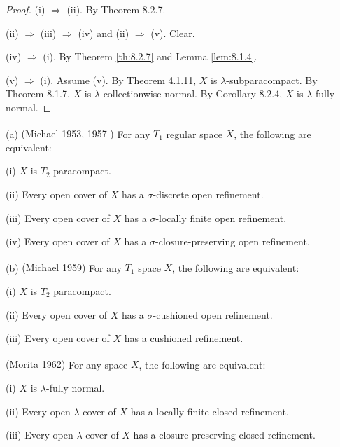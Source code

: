 \documentclass[jiang8iv.tex]{subfiles}
\begin{document}
\begin{proof} (i) \(\Rightarrow\) (ii). By Theorem 8.2.7.

(ii) \(\Rightarrow\) (iii) $\Rightarrow$ (iv) 
and (ii) \(\Rightarrow\) (v). Clear.

(iv) \(\Rightarrow\) (i). By Theorem \ref{th:8.2.7} and Lemma \ref{lem:8.1.4}.

(v) \(\Rightarrow\) (i). Assume (v). By Theorem 4.1.11, \(X\) is \(\lambda\)-subparacompact. By Theorem 8.1.7, \(X\) is \(\lambda\)-collectionwise normal. By Corollary 8.2.4, \(X\) is \(\lambda\)-fully normal. 
\end{proof}


{\corollary{} \label{cor:8.2.9} 
\textup{(a)} \textup{(\hstretch{1.8}{[}Michael 1953, 1957\hstretch{1.8}{]}\textsuperscript{\cite{Michael1953}}
	\textsuperscript{\cite{Michael1957}})}
For any \(T_1\) regular space \(X\), the following are equivalent:

\quad\textup{(i)} \(X\) is \(T_2\) paracompact.

\quad\textup{(ii)} Every open cover  of $X$ has a \(\sigma\)-discrete open refinement.

\quad\textup{(iii)} Every open cover  of $X$ has a \(\sigma\)-locally finite open refinement.

\quad\textup{(iv)} Every open cover  of $X$ has a \(\sigma\)-closure-preserving open refinement.

\textup{(b)}  \textup{(\hstretch{1.8}{[}Michael 1959\hstretch{1.8}{]}\textsuperscript{\cite{Michael1959}})}
For any \(T_1\) space \(X\), the following are equivalent:

\quad\textup{(i)} \(X\) is \(T_2\) paracompact.

\quad\textup{(ii)}  Every open cover  of $X$ has a \(\sigma\)-cushioned open refinement.

\quad\textup{(iii)} Every open cover  of $X$ has a cushioned refinement.\hfill\qedsymbol
}

{\corollary{} \label{cor:8.2.10}
 \textup{(\hstretch{1.8}{[}Morita 1962\hstretch{1.8}{]}\textsuperscript{\cite{Morita1962}})}
For any space $X$, the following are equivalent:

\textup{(i)}  \(X\) is \(\lambda\)-fully normal.

\textup{(ii)}   Every open \(\lambda\)-cover  of $X$ has a locally finite closed refinement.

\textup{(iii)}   Every open \(\lambda\)-cover  of $X$ has a closure-preserving closed 
refinement.\hfill\qedsymbol
}
\end{document}
